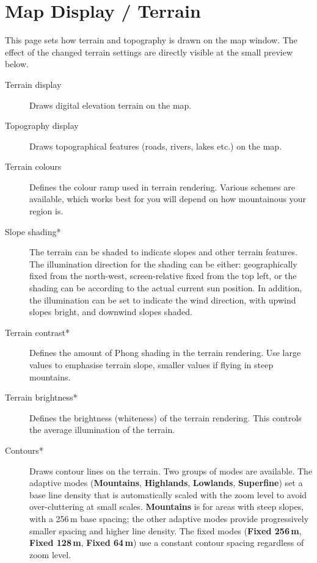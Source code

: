 \section{Map Display / Terrain}\label{sec:terrain-display}

This page sets how terrain and topography is drawn on the map window. The effect of the 
changed terrain settings are directly visible at the small preview below.

\begin{description}
\item[Terrain display]  Draws digital elevation terrain on the map.
\item[Topography display]  Draws topographical features (roads, rivers, lakes etc.) on
  the map.
\item[Terrain colours]  Defines the colour ramp used in terrain rendering.  Various 
  schemes are available, which works best for you will depend on how mountainous your region is.
\item[Slope shading*]  \label{conf:shading} The terrain can be shaded to indicate slopes and 
  other terrain features. The illumination direction for the shading can be either: geographically
  fixed from the north-west, screen-relative fixed from the top left, or the shading can be 
  according to the actual current sun position. In addition, the illumination can be set to indicate 
  the wind direction, with upwind slopes bright, and downwind slopes shaded.
\item[Terrain contrast*]  Defines the amount of Phong shading in the terrain rendering. 
  Use large values to emphasise terrain slope, smaller values if flying in steep mountains.
\item[Terrain brightness*]  Defines the brightness (whiteness) of the terrain rendering.
  This controls the average illumination of the terrain.
\item[Contours*]  Draws contour lines on the terrain.  Two groups of
  modes are available.
  The adaptive modes ({\bf Mountains}, {\bf Highlands}, {\bf Lowlands},
  {\bf Superfine}) set a base line density that is automatically scaled
  with the zoom level to avoid over-cluttering at small scales.
  {\bf Mountains} is for areas with steep slopes, with a 256\,m base
  spacing; the other adaptive modes provide progressively smaller
  spacing and higher line density.
  The fixed modes ({\bf Fixed 256\,m}, {\bf Fixed 128\,m},
  {\bf Fixed 64\,m}) use a constant contour spacing regardless of zoom
  level.
\end{description}



